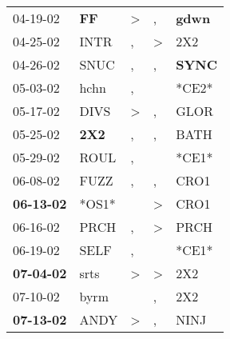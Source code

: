 \begin{supertabular}{p{0.07\textwidth}p{0.06\textwidth}p{0.02\textwidth}p{0.02\textwidth}p{0.06\textwidth}}
          04-19-02\textsuperscript{} &    \textbf{FF\textsuperscript{}} &     \textgreater &                , &  \textbf{gdwn\textsuperscript{}} \\
          04-25-02\textsuperscript{} &           INTR\textsuperscript{} &                , &     \textgreater &            2X2\textsuperscript{} \\
          04-26-02\textsuperscript{} &           SNUC\textsuperscript{} &                , &                , &  \textbf{SYNC\textsuperscript{}} \\
          05-03-02\textsuperscript{} &           hchn\textsuperscript{} &                , &                  &                            *CE2* \\
          05-17-02\textsuperscript{} &           DIVS\textsuperscript{} &     \textgreater &                , &           GLOR\textsuperscript{} \\
          05-25-02\textsuperscript{} &   \textbf{2X2\textsuperscript{}} &                , &                , &           BATH\textsuperscript{} \\
          05-29-02\textsuperscript{} &           ROUL\textsuperscript{} &                , &                  &                            *CE1* \\
          06-08-02\textsuperscript{} &           FUZZ\textsuperscript{} &                , &                , &           CRO1\textsuperscript{} \\
 \textbf{06-13-02\textsuperscript{}} &                            *OS1* &                  &     \textgreater &           CRO1\textsuperscript{} \\
          06-16-02\textsuperscript{} &           PRCH\textsuperscript{} &                , &     \textgreater &           PRCH\textsuperscript{} \\
          06-19-02\textsuperscript{} &           SELF\textsuperscript{} &                , &                  &                            *CE1* \\
 \textbf{07-04-02\textsuperscript{}} &           srts\textsuperscript{} &     \textgreater &     \textgreater &            2X2\textsuperscript{} \\
          07-10-02\textsuperscript{} &           byrm\textsuperscript{} &                  &                , &            2X2\textsuperscript{} \\
 \textbf{07-13-02\textsuperscript{}} &           ANDY\textsuperscript{} &     \textgreater &                , &           NINJ\textsuperscript{} \\

\end{supertabular}
